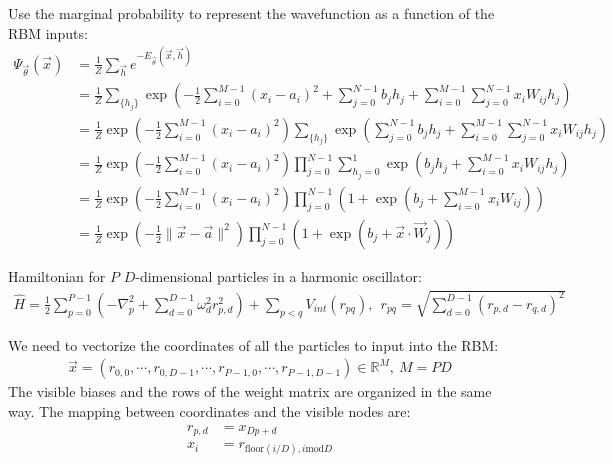 \documentclass[12pt]{article}
\begin{document}
\noindent Use the marginal probability to represent the wavefunction as a function of the RBM inputs:
\begin{align*}
\Psi_{\vec{\theta}}(\vec{x}) &= \frac{1}{Z} \sum_{\vec{h}} e^{-E_{\vec{\theta}}(\vec{x},\vec{h})}\\
&= \frac{1}{Z} \sum_{ \{ h_j \} } \exp \left( -\frac{1}{2} \sum_{i=0}^{M-1}(x_i - a_i)^2 + \sum_{j=0}^{N-1} b_j h_j + \sum_{i=0}^{M-1}\sum_{j=0}^{N-1} x_i W_{ij} h_j  \right)\\
&=\frac{1}{Z} \exp \left( -\frac{1}{2} \sum_{i=0}^{M-1}(x_i - a_i)^2 \right) \sum_{ \{ h_j \} } \exp \left( \sum_{j=0}^{N-1} b_j h_j + \sum_{i=0}^{M-1}\sum_{j=0}^{N-1} x_i W_{ij} h_j  \right)\\
&=\frac{1}{Z} \exp \left( -\frac{1}{2} \sum_{i=0}^{M-1}(x_i - a_i)^2 \right) \prod_{j=0}^{N-1} \sum_{ h_j=0 }^1 \exp \left( b_j h_j + \sum_{i=0}^{M-1} x_i W_{ij} h_j  \right)\\
&=\frac{1}{Z} \exp \left( -\frac{1}{2} \sum_{i=0}^{M-1}(x_i - a_i)^2 \right) \prod_{j=0}^{N-1} \left( 1 + \exp \left( b_j + \sum_{i=0}^{M-1} x_i W_{ij} \right) \right)\\
&= \frac{1}{Z} \exp \left( -\frac{1}{2} \| \vec{x}-\vec{a} \|^2 \right) \prod_{j=0}^{N-1} \left( 1 + \exp \left( b_j + \vec{x} \cdot \vec{W}_j \right) \right)
\end{align*}

\noindent Hamiltonian for $P$ $D$-dimensional particles in a harmonic oscillator:
\begin{align*}
\hat{H} = \frac{1}{2} \sum_{p = 0}^{P-1} \left( -\nabla_p^2 + \sum_{d=0}^{D-1} \omega_d^2 r_{p,d}^2 \right) + \sum_{p<q} V_{int} (r_{pq}), \ \ r_{pq} = \sqrt{ \sum_{d=0}^{D-1} (r_{p,d}-r_{q,d})^2 } 
\end{align*}




\noindent We need to vectorize the coordinates of all the particles to input into the RBM:
\begin{align*}
\vec{x} = ( r_{0,0}, \cdots, r_{0,D-1}, \cdots, r_{P-1,0}, \cdots, r_{P-1,D-1} ) \in \mathbb{R}^M, \ M = PD
\end{align*}
\noindent The visible biases and the rows of the weight matrix are organized in the same way. The mapping between coordinates and the visible nodes are:
\begin{align*}
r_{p,d} &= x_{Dp+d}\\
x_i &= r_{\text{floor}(i/D), i \text{mod} D}
\end{align*}
\end{document}
